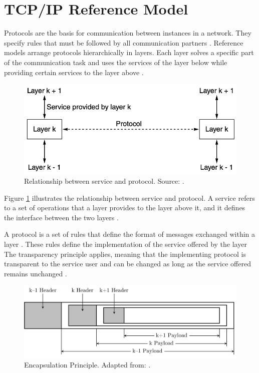 \clearpage


\section{TCP/IP Reference Model} \label{chap:RefModel}

Protocols are the basis for communication between instances in a network. They specify rules that must be followed by all communication partners \cite{Tanenbaum2010}. Reference models arrange protocols hierarchically in layers. Each layer solves a specific part of the communication task and uses the services of the layer below while providing certain services to the layer above \cite{Weigel2021}.

\begin{figure}[h]
    \centering
    \includegraphics[width=0.7\linewidth]{figures/tcpip_refmodel/image1.png}
    \caption[Relationship between service and protocol]{Relationship between service and protocol. Source: \cite{Tanenbaum2010}.}
    \label{fig:ServiceProtRelation}
\end{figure}

Figure \ref{fig:ServiceProtRelation} illustrates the relationship between service and protocol. A service refers to a set of operations that a layer provides to the layer above it, and it defines the interface between the two layers \cite{Tanenbaum2010}.

A protocol is a set of rules that define the format of messages exchanged within a layer \cite{Tanenbaum2010}. These rules define the implementation of the service offered by the layer The transparency principle applies, meaning that the implementing protocol is transparent to the service user and can be changed as long as the service offered remains unchanged \cite{Weigel2021}.

\begin{figure}[h!]
    \centering
    \includegraphics[width=1\linewidth]{figures/tcpip_refmodel/image2.pdf}
    \caption[Encapsulation Principle]{Encapsulation Principle. Adapted from: \cite{Tanenbaum2010}.}
    \label{fig:EncapsulationPrinciple}
\end{figure}

